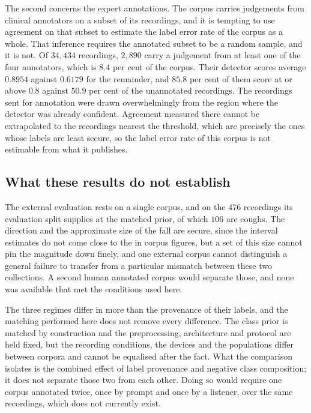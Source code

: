 \documentclass{ieeeaccess}
\begin{document}
The second concerns the expert annotations. The corpus carries judgements from clinical
annotators on a subset of its recordings, and it is tempting to use agreement on that
subset to estimate the label error rate of the corpus as a whole. That inference requires
the annotated subset to be a random sample, and it is not. Of $34{,}434$ recordings,
$2{,}890$ carry a judgement from at least one of the four annotators, which is $8.4$ per
cent of the corpus. Their detector scores average $0.8954$ against $0.6179$ for the
remainder, and $85.8$ per cent of them score at or above $0.8$ against $50.9$ per cent of
the unannotated recordings. The recordings sent for
annotation were drawn overwhelmingly from the region where the detector was already
confident. Agreement measured there cannot be extrapolated to the recordings nearest the
threshold, which are precisely the ones whose labels are least secure, so the label error
rate of this corpus is not estimable from what it publishes.

\subsection{What these results do not establish}\label{sec:res-limits}

The external evaluation rests on a single corpus, and on the $476$ recordings its
evaluation split supplies at the matched prior, of which $106$ are coughs. The direction
and the approximate size of the fall are secure, since the interval estimates do not come
close to the in corpus figures, but a set of this size cannot pin the magnitude down
finely, and one external corpus cannot distinguish a general failure to transfer from a
particular mismatch between these two collections. A second human annotated corpus would
separate those, and none was available that met the conditions used here.

The three regimes differ in more than the provenance of their labels, and the matching
performed here does not remove every difference. The class prior is matched by
construction and the preprocessing, architecture and protocol are held fixed, but the
recording conditions, the devices and the populations differ between corpora and cannot be
equalised after the fact. What the comparison isolates is the combined effect of label
provenance and negative class composition; it does not separate those two from each other.
Doing so would require one corpus annotated twice, once by prompt and once by a listener,
over the same recordings, which does not currently exist.
\end{document}
